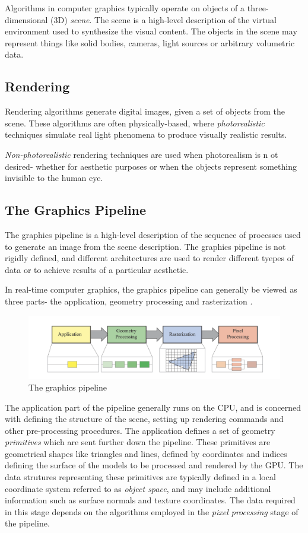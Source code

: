 \documentclass{article}
\begin{document}
Algorithms in computer graphics typically operate on objects of a three-dimensional (3D) \textit{scene}. The scene is a high-level description of the virtual environment used to synthesize the visual content.
The objects in the scene may represent things like solid bodies, cameras, light sources or arbitrary volumetric data.

\subsection{Rendering}
Rendering algorithms generate digital images, given a set of objects from the scene. These algorithms
are often physically-based, where \textit{photorealistic} techniques simulate real light phenomena to produce visually realistic results. 


\textit{Non-photorealistic} rendering techniques are used when photorealism is n    ot desired- whether for aesthetic purposes or when the objects represent something
invisible to the human eye. 

\subsection{The Graphics Pipeline}
The graphics pipeline is a high-level description of the sequence of processes used to 
generate an image from the scene description. The graphics pipeline is not rigidly defined,
and different architectures are used to render different tyepes of data or to achieve results of a particular aesthetic.

In real-time computer graphics, the graphics pipeline can generally be viewed as three parts- the application, geometry processing and rasterization \cite{RealTimeRendering}.

\begin{figure}[tbh]
    \centering
    \includegraphics[width=1.0\textwidth]{images/graphics_pipeline.png}
    \caption{The graphics pipeline \cite{RealTimeRendering}}
    \label{fig:pipelineRealTimeRendering}
\end{figure}

The application part of the pipeline generally runs on the CPU, and is concerned with defining the structure of the scene, setting up rendering commands and other pre-processing procedures.
The application defines a set of geometry \textit{primitives} which are sent further down the pipeline. These primitives
are geometrical shapes like triangles and lines, defined by coordinates and indices defining the surface of the models to be processed and rendered by the GPU.
The data strutures representing these primitives are typically defined in a local coordinate system referred to as \textit{object space}, and may include additional information such as surface normals and texture coordinates. The data required
in this stage depends on the algorithms employed in the \textit{pixel processing} stage of the pipeline.
\end{document}
